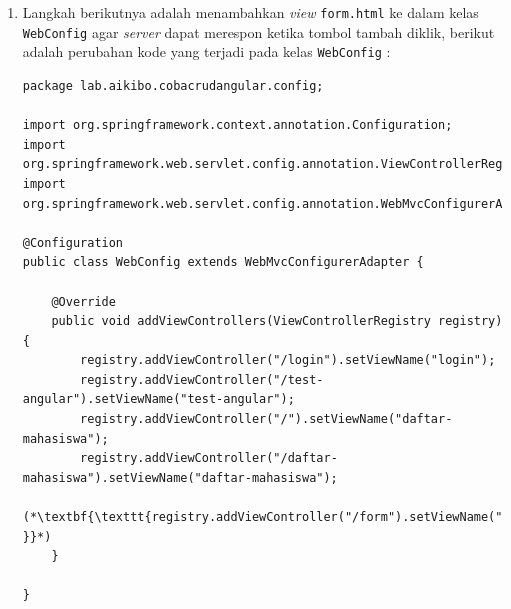 \begin{enumerate}
\begin{lstlisting}
/**
 *
 * @author tamami <tamami.oka@gmail.com>
 */
@RestController
public class ApiRestController {
    
    @Autowired
    private MahasiswaRepo mhsRepo;
    
    @Autowired
    private MahasiswaRepoPaging mhsRepoPaging;
    
    @RequestMapping("/daftar-mahasiswa")
    public List<Mahasiswa> getDaftarMahasiswa() {
        return mhsRepo.findAll();
    }
    
    @RequestMapping("/daftar-mahasiswa-with-paging")
    public Page<Mahasiswa> getDaftarMahasiswaWithPaging(Pageable pageable) {
        return mhsRepoPaging.findAll(pageable);
    }
    
    (*\textbf{\texttt{@RequestMapping(value = "/tambah-data", }}*)
        (*\textbf{\texttt{method = RequestMethod.POST) }}*)
    (*\textbf{\texttt{public void tambahData( }}*)
        (*\textbf{\texttt{@RequestBody Mahasiswa mhs) \{ }}*)
      (*\textbf{\texttt{mhsRepo.save(mhs); }}*)
    (*\textbf{\texttt{\} }}*)
}	
	\end{lstlisting}
	
	\item Langkah berikutnya adalah menambahkan \textit{view} \texttt{form.html} ke dalam kelas \texttt{WebConfig} agar \textit{server} dapat merespon ketika tombol tambah diklik, berikut adalah perubahan kode yang terjadi pada kelas \texttt{WebConfig} :
	
	\begin{lstlisting}
package lab.aikibo.cobacrudangular.config;

import org.springframework.context.annotation.Configuration;
import org.springframework.web.servlet.config.annotation.ViewControllerRegistry;
import org.springframework.web.servlet.config.annotation.WebMvcConfigurerAdapter;

@Configuration
public class WebConfig extends WebMvcConfigurerAdapter {

	@Override
	public void addViewControllers(ViewControllerRegistry registry) {
		registry.addViewController("/login").setViewName("login");
		registry.addViewController("/test-angular").setViewName("test-angular");
        registry.addViewController("/").setViewName("daftar-mahasiswa");
        registry.addViewController("/daftar-mahasiswa").setViewName("daftar-mahasiswa");
        (*\textbf{\texttt{registry.addViewController("/form").setViewName("form"); }}*)
	}

}
	\end{lstlisting}	
	

\end{enumerate}
